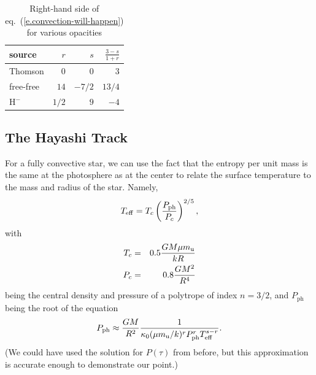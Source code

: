 \begin{table}[htbp]
\caption{Right-hand side of eq.~(\ref{e.convection-will-happen}) for various opacities}
\label{t.rhs}
\begin{center}
\begin{tabular}{lrrr}
\hline
source & $r$ & $s$ & $\frac{3-s}{1+r}$\\
\hline\hline
Thomson & $0$ & $0$ & $3$\\
free-free & $14$ & $-7/2$ & $13/4$\\
H$^{-}$ & $1/2$ & $9$ & $-4$\\
\hline
\end{tabular}
\end{center}
\end{table}

\subsection{The Hayashi Track}\label{s.Hayashi}

For a fully convective star, we can use the fact that the entropy per unit mass is the same at the photosphere as at the center to relate the surface temperature to the mass and radius of the star. Namely,
\begin{equation}\label{e.Teff-adiabat}
T_{\mathrm{eff}} = T_{c}\left(\frac{P_{\mathrm{ph}}}{P_{c}}\right)^{2/5},
\end{equation}
with
\begin{eqnarray}
T_{c} &=& 0.5 \frac{GM\mu m_\mathrm{u}}{kR} \label{e.fc-Tc}\\
P_{c} &=& 0.8\frac{GM^{2}}{R^{4}} \label{e.fc-Pc}
\end{eqnarray}
being the central density and pressure of a polytrope of index $n=3/2$, and $P_{\mathrm{ph}}$ being the root of the equation
\begin{equation}\label{e.pph}
 P_{\mathrm{ph}} \approx \frac{GM}{R^{2}}\frac{1}{\kappa_{0}(\mu m_\mathrm{u}/k)^{r}P_{\mathrm{ph}}^{r}T_{\mathrm{eff}}^{s-r}}. 
\end{equation}
(We could have used the solution for $P(\tau)$ from before, but this approximation is accurate enough to demonstrate our point.)

